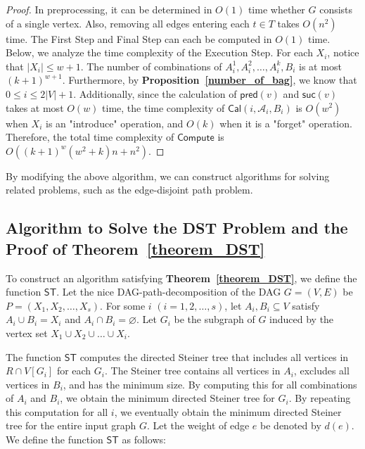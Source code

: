 \documentclass[runningheads]{llncs}
\theoremstyle{plain}
\theoremstyle{definition}
\begin{document}
\begin{proof}
    In preprocessing, it can be determined in $O(1)$ time whether $G$ consists of a single vertex. Also, removing all edges entering each $t \in T$ takes $O(n^2)$ time. The First Step and Final Step can each be computed in $O(1)$ time. Below, we analyze the time complexity of the Execution Step. For each $X_i$, notice that $|X_i| \leq w+1$. The number of combinations of $A^1_i, A^2_i, \dots, A^k_i, B_i$ is at most $(k+1)^{w+1}$. Furthermore, by \textbf{Proposition~\ref{number_of_bag}}, we know that $0 \leq i \leq 2|V|+1$. Additionally, since the calculation of $\mathsf{pred}(v)$ and $\mathsf{suc}(v)$ takes at most $O(w)$ time, the time complexity of $\mathsf{Cal}(i, \mathscr{A}_i, B_i)$ is $O(w^2)$ when $X_i$ is an "introduce" operation, and $O(k)$ when it is a "forget" operation. Therefore, the total time complexity of $\mathsf{Compute}$ is $O((k+1)^w(w^2+k)n+n^2)$.
\end{proof}

By modifying the above algorithm, we can construct algorithms for solving related problems, such as the edge-disjoint path problem.






\subsection{Algorithm to Solve the DST Problem and the Proof of \textbf{Theorem~\ref{theorem_DST}}}

To construct an algorithm satisfying \textbf{Theorem~\ref{theorem_DST}}, we define the function $\mathsf{ST}$. Let the nice DAG-path-decomposition of the DAG $G = (V, E)$ be $P = (X_1, X_2, \dots, X_s)$. For some $i$ $(i = 1, 2, \dots, s)$, let $A_i, B_i \subseteq V$ satisfy $A_i \cup B_i = X_i$ and $A_i \cap B_i = \varnothing$. Let $G_i$ be the subgraph of $G$ induced by the vertex set $X_1 \cup X_2 \cup \dots \cup X_i$.

The function $\mathsf{ST}$ computes the directed Steiner tree that includes all vertices in $R \cap V[G_i]$ for each $G_i$. The Steiner tree contains all vertices in $A_i$, excludes all vertices in $B_i$, and has the minimum size. By computing this for all combinations of $A_i$ and $B_i$, we obtain the minimum directed Steiner tree for $G_i$. By repeating this computation for all $i$, we eventually obtain the minimum directed Steiner tree for the entire input graph $G$. Let the weight of edge $e$ be denoted by $d(e)$. We define the function $\mathsf{ST}$ as follows:
\end{document}

